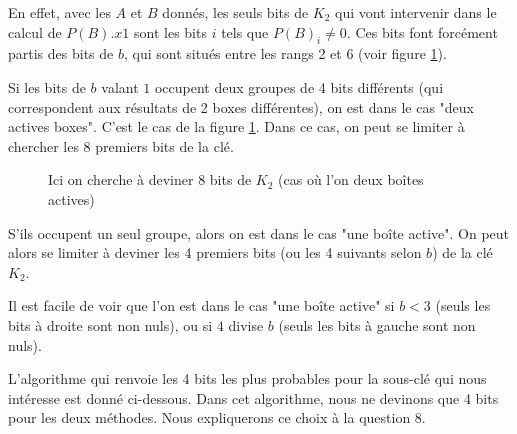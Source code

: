 En effet, avec les $A$ et $B$ donnés, les seuls bits de $K_2$ qui vont intervenir dans le calcul de $P(B).x1$ sont les bits $i$ tels que $P(B)_i \neq 0$. Ces bits font forcément partis des bits de $b$, qui sont situés entre les rangs 2 et 6 (voir figure 
\ref{illustration_bits_key}).

Si les bits de $b$ valant $1$ occupent deux groupes de 4 bits différents (qui correspondent aux résultats de 2 boxes différentes), on est dans le cas "deux actives boxes". C'est le cas de la figure \ref{illustration_bits_key}. Dans ce cas, on peut se limiter à chercher les 8 premiers bits de la clé.


\begin{figure}[!ht]
\centering
{}
\caption{Ici on cherche à deviner 8 bits de $K_2$ (cas où l'on deux boîtes actives)}
\label{illustration_bits_key}
\end{figure}


S'ils occupent un seul groupe, alors on est dans le cas "une boîte active". On peut alors se limiter à deviner les 4 premiers bits (ou les 4 suivants selon $b$) de la clé $K_2$.

Il est facile de voir que l'on est dans le cas "une boîte active" si $b < 3$ (seuls les bits à droite sont non nuls), ou si $4$ divise $b$ (seuls les bits à gauche sont non nuls).

L'algorithme qui renvoie les 4 bits les plus probables pour la sous-clé qui nous intéresse est donné ci-dessous. Dans cet algorithme, nous ne devinons que 4 bits pour les deux méthodes. Nous expliquerons ce choix à la question 8.

